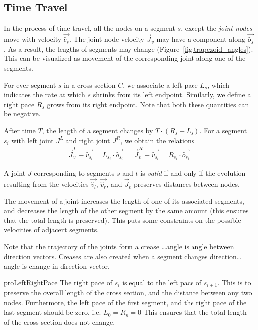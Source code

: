 \subsection{Time Travel}
\label{sec:time_travel}

In the process of time travel, all the nodes on a segment $s$, except the \emph{joint nodes} move with velocity $\vec{\hat v_s}$.
The joint node velocity $\vec J_v$ may have a component along $\vec{\hat o_s}$.  As a result, the lengths of segments may change (Figure~\ref{fig:trapezoid_angles}).
This can be visualized as movement of the corresponding joint along one of the segments.

\begin{definition}
\label{def:segment_length}
For ever segment $s$ in a cross section $C$, we associate a left pace $L_s$,
which indicates the rate at which $s$ shrinks from its left endpoint.
Similarly, we define a right pace $R_s$ grows from its right endpoint.
Note that both these quantities can be negative.
\end{definition}
After time $T$, the length of a segment changes by $T\cdot(R_s-L_s)$.
For a segment $s_i$ with left joint $J^L$ and right joint $J^R$, we obtain the relations
\begin{align}
\vec J_v^L-\vec{\hat v_{s_i}} = L_{s_i}\cdot \vec{\hat o_{s_i}} && \vec J_v^R-\vec{\hat v_{s_i}} = R_{s_i}\cdot \vec{\hat o_{s_i}}
\end{align}

\begin{proposition}
\label{prop:valid_joint}
A joint $J$ corresponding to segments $s$ and $t$ is \emph{valid} if and only if the evolution
resulting from the velocities $\vec{\hat v_l}$, $\vec{\hat v_r}$, and $\vec J_v$ preserves distances between nodes.
\end{proposition}

The movement of a joint increases the length of one of its associated segments,
and decreases the length of the other segment by the same amount (this ensures that the total length is preserved).
This puts some constraints on the possible velocities of adjacent segments.

Note that the trajectory of the joints form a crease \ldots angle is angle between direction vectors.
Creases are also created when a segment changes direction\ldots angle is change in direction vector.

\begin{restatable}{pro}{LeftRightPace}
\label{pro:left_right_pace}
The right pace of $s_{i}$ is equal to the left pace of $s_{i+1}$.
This is to preserve the overall length of the cross section, and the distance between any two nodes.
Furthermore, the left pace of the first segment, and the right pace of the last segment should be zero, i.e. $L_0 = R_n = 0$
This ensures that the total length of the cross section does not change.
\end{restatable}


